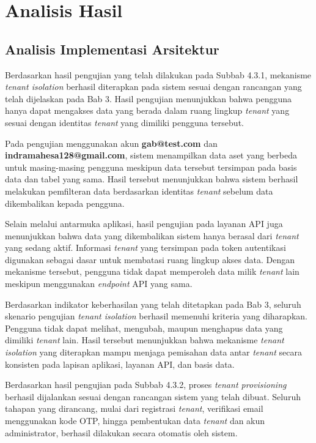 \section{Analisis Hasil}

\subsection{Analisis Implementasi Arsitektur}

Berdasarkan hasil pengujian yang telah dilakukan pada Subbab 4.3.1, mekanisme \textit{tenant isolation} berhasil diterapkan pada sistem sesuai dengan rancangan yang telah dijelaskan pada Bab 3. Hasil pengujian menunjukkan bahwa pengguna hanya dapat mengakses data yang berada dalam ruang lingkup \textit{tenant} yang sesuai dengan identitas \textit{tenant} yang dimiliki pengguna tersebut.

Pada pengujian menggunakan akun \textbf{gab@test.com} dan \textbf{indramahesa128@gmail.com}, sistem menampilkan data aset yang berbeda untuk masing-masing pengguna meskipun data tersebut tersimpan pada basis data dan tabel yang sama. Hasil tersebut menunjukkan bahwa sistem berhasil melakukan pemfilteran data berdasarkan identitas \textit{tenant} sebelum data dikembalikan kepada pengguna.

Selain melalui antarmuka aplikasi, hasil pengujian pada layanan API juga menunjukkan bahwa data yang dikembalikan sistem hanya berasal dari \textit{tenant} yang sedang aktif. Informasi \textit{tenant} yang tersimpan pada token autentikasi digunakan sebagai dasar untuk membatasi ruang lingkup akses data. Dengan mekanisme tersebut, pengguna tidak dapat memperoleh data milik \textit{tenant} lain meskipun menggunakan \textit{endpoint} API yang sama.

Berdasarkan indikator keberhasilan yang telah ditetapkan pada Bab 3, seluruh skenario pengujian \textit{tenant isolation} berhasil memenuhi kriteria yang diharapkan. Pengguna tidak dapat melihat, mengubah, maupun menghapus data yang dimiliki \textit{tenant} lain. Hasil tersebut menunjukkan bahwa mekanisme \textit{tenant isolation} yang diterapkan mampu menjaga pemisahan data antar \textit{tenant} secara konsisten pada lapisan aplikasi, layanan API, dan basis data.

Berdasarkan hasil pengujian pada Subbab 4.3.2, proses \textit{tenant provisioning} berhasil dijalankan sesuai dengan rancangan sistem yang telah dibuat. Seluruh tahapan yang dirancang, mulai dari registrasi \textit{tenant}, verifikasi email menggunakan kode OTP, hingga pembentukan data \textit{tenant} dan akun administrator, berhasil dilakukan secara otomatis oleh sistem.

